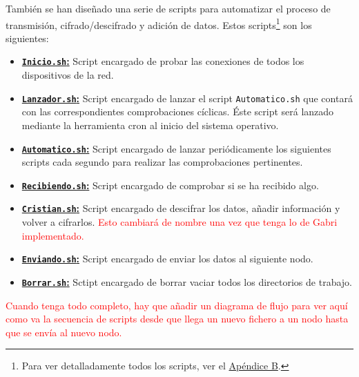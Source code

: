 También se han diseñado una serie de scripts para automatizar el proceso de transmisión, cifrado/descifrado y adición de datos. Estos scripts\footnote{Para ver detalladamente todos los scripts, ver el \hyperlink{Scripts}{Apéndice B}.} son los siguientes:
\begin{itemize}
	\item \hyperlink{ScriptConexion}{\textbf{\texttt{Inicio.sh}:}} Script encargado de probar las conexiones de todos los dispositivos de la red.
	\item \hyperlink{ScriptLanzador}{\textbf{\texttt{Lanzador.sh}:}} Script encargado de lanzar el script \texttt{Automatico.sh} que contará con las correspondientes comprobaciones cíclicas. Éste script será lanzado mediante la herramienta cron al inicio del sistema operativo.
	\item \hyperlink{ScriptAutomatico}{\textbf{\texttt{Automatico.sh}:}} Script encargado de lanzar periódicamente los siguientes scripts cada segundo para realizar las comprobaciones pertinentes.
	\item \hyperlink{ScriptRecibiendo}{\textbf{\texttt{Recibiendo.sh}:}} Script encargado de comprobar si se ha recibido algo.
	\item \hyperlink{ScriptCristian}{\textbf{\texttt{Cristian.sh}:}} Script encargado de descifrar los datos, añadir información y volver a cifrarlos. \textcolor{red}{Esto cambiará de nombre una vez que tenga lo de Gabri implementado.}
	\item \hyperlink{ScriptEnviando}{\textbf{\texttt{Enviando.sh}:}} Script encargado de enviar los datos al siguiente nodo.
	\item \hyperlink{ScriptBorrar}{\textbf{\texttt{Borrar.sh}:}} Sctipt encargado de borrar vaciar todos los directorios de trabajo.
\end{itemize}

\textcolor{red}{Cuando tenga todo completo, hay que añadir un diagrama de flujo para ver aquí como va la secuencia de scripts desde que llega un nuevo fichero a un nodo hasta que se envía al nuevo nodo.}